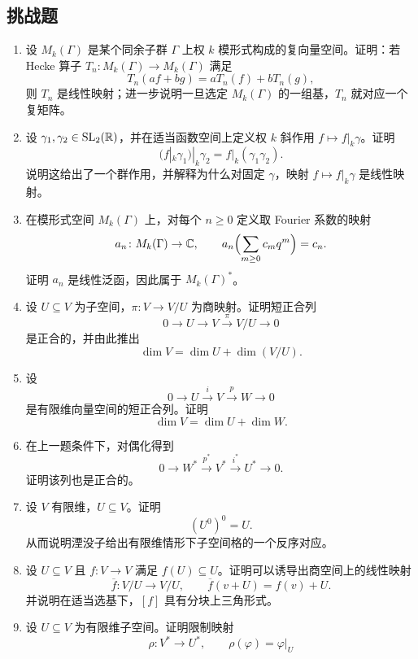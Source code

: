 \subsection*{挑战题}

\begin{enumerate}[label=\textbf{\arabic*.}, leftmargin=3.5em, start=56]
  \item {\hard} 设 $M_k(\Gamma)$ 是某个同余子群 $\Gamma$ 上权 $k$ 模形式构成的复向量空间。证明：若 Hecke 算子 $T_n\colon M_k(\Gamma)\to M_k(\Gamma)$ 满足
  \[
    T_n(af+bg)=aT_n(f)+bT_n(g),
  \]
  则 $T_n$ 是线性映射；进一步说明一旦选定 $M_k(\Gamma)$ 的一组基，$T_n$ 就对应一个复矩阵。
  \item {\hard} 设 $\gamma_1,\gamma_2\in \mathrm{SL}_2(\mathbb{R})$，并在适当函数空间上定义权 $k$ 斜作用 $f\mapsto f|_k\gamma$。证明
  \[
    (f|_k\gamma_1)|_k\gamma_2=f|_k(\gamma_1\gamma_2).
  \]
  说明这给出了一个群作用，并解释为什么对固定 $\gamma$，映射 $f\mapsto f|_k\gamma$ 是线性映射。
  \item {\hard} 在模形式空间 $M_k(\Gamma)$ 上，对每个 $n\ge 0$ 定义取 Fourier 系数的映射
  \[
    a_n\colon M_k(\Gamma)\to \mathbb{C},
    \qquad
    a_n\Bigl(\sum_{m\ge 0} c_m q^m\Bigr)=c_n.
  \]
  证明 $a_n$ 是线性泛函，因此属于 $M_k(\Gamma)^*$。
  \item {\hard} 设 $U\subseteq V$ 为子空间，$\pi\colon V\to V/U$ 为商映射。证明短正合列
  \[
    0\longrightarrow U\longrightarrow V\overset{\pi}{\longrightarrow} V/U\longrightarrow 0
  \]
  是正合的，并由此推出
  \[
    \dim V=\dim U+\dim(V/U).
  \]
  \item {\hard} 设
  \[
    0\longrightarrow U\overset{i}{\longrightarrow} V\overset{p}{\longrightarrow} W\longrightarrow 0
  \]
  是有限维向量空间的短正合列。证明
  \[
    \dim V=\dim U+\dim W.
  \]
  \item {\hard} 在上一题条件下，对偶化得到
  \[
    0\longrightarrow W^*\overset{p^*}{\longrightarrow} V^*\overset{i^*}{\longrightarrow} U^*\longrightarrow 0.
  \]
  证明该列也是正合的。
  \item {\hard} 设 $V$ 有限维，$U\subseteq V$。证明
  \[
    (U^0)^0=U.
  \]
  从而说明湮没子给出有限维情形下子空间格的一个反序对应。
  \item {\hard} 设 $U\subseteq V$ 且 $f\colon V\to V$ 满足 $f(U)\subseteq U$。证明可以诱导出商空间上的线性映射
  \[
    \overline f\colon V/U\to V/U,
    \qquad
    \overline f(v+U)=f(v)+U.
  \]
  并说明在适当选基下，$[f]$ 具有分块上三角形式。
  \item {\hard} 设 $U\subseteq V$ 为有限维子空间。证明限制映射
  \[
    \rho\colon V^*\to U^*,\qquad \rho(\varphi)=\varphi|_U
\]
\end{enumerate}
